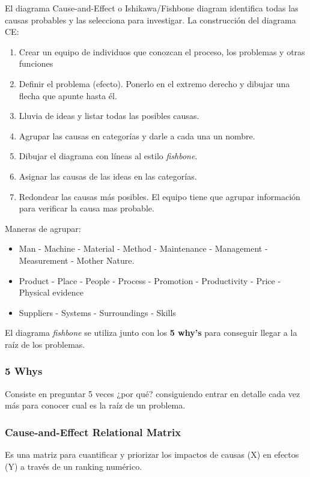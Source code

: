 \documentclass[]{article}
\begin{document}
El diagrama Cause-and-Effect o Ishikawa/Fishbone diagram identifica todas las causas probables y las selecciona para investigar. La construcción del diagrama CE:
\begin{enumerate}
	\item Crear un equipo de individuos que conozcan el proceso, los problemas y otras funciones
	\item Definir el problema (efecto). Ponerlo en el extremo derecho y dibujar una flecha que apunte hasta él.
	\item Lluvia de ideas y listar todas las posibles causas.
	\item Agrupar las causas en categorías y darle a cada una un nombre.
	\item Dibujar el diagrama con líneas al estilo \textit{fishbone}.
	\item Asignar las causas de las ideas en las categorías.
	\item Redondear las causas más posibles. El equipo tiene que agrupar información para verificar la causa mas probable.
\end{enumerate}
Maneras de agrupar: \begin{itemize}
	\item Man - Machine - Material - Method - Maintenance - Management - Measurement - Mother Nature.
	\item Product - Place - People - Process - Promotion - Productivity - Price - Physical evidence
	\item Suppliers - Systems - Surroundings - Skills
\end{itemize}
El diagrama \textit{fishbone} se utiliza junto con los \textbf{5 why's} para conseguir llegar a la raíz de los problemas.

\subsubsection{5 Whys}
Consiste en preguntar 5 veces ¿por qué? consiguiendo entrar en detalle cada vez más para conocer cual es la raíz de un problema.

\subsubsection{Cause-and-Effect Relational Matrix}
Es una matriz para cuantificar y priorizar los impactos de causas (X) en efectos (Y) a través de un ranking numérico. 
\end{document}
